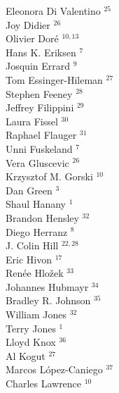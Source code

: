 \documentclass[PICOAPC.tex]{subfiles}
\begin{document}
{\begin{multicols}{4}
Eleonora Di Valentino $^{25}$           \\
Joy Didier $^{26}$                      \\
Olivier Dor\'e $^{10,13}$                  \\
Hans K. Eriksen $^{7}$                 \\
Josquin Errard $^{9}$                  \\
Tom Essinger-Hileman $^{27}$            \\
Stephen Feeney $^{28}$                  \\
Jeffrey Filippini $^{29}$               \\
Laura Fissel $^{30}$                    \\
Raphael Flauger $^{31}$                 \\
Unni Fuskeland $^{7}$                  \\
Vera Gluscevic $^{26}$                  \\
Krzysztof M. Gorski $^{10}$             \\
Dan Green $^{3}$                       \\
Shaul Hanany $^{1}$                    \\
Brandon Hensley $^{32}$                 \\
Diego Herranz $^{8}$                   \\
J. Colin Hill $^{22,28}$                   \\
Eric Hivon $^{17}$                      \\
Ren\'{e}e  Hlo\v{z}ek $^{33}$           \\
Johannes Hubmayr $^{34}$                \\
Bradley R. Johnson $^{35}$              \\
William Jones $^{32}$                   \\
Terry Jones $^{1}$                     \\
Lloyd Knox $^{36}$                      \\
Al Kogut $^{27}$                        \\
Marcos L\'{o}pez-Caniego $^{37}$        \\
Charles Lawrence $^{10}$                \\

\end{multicols}}
\end{document}
